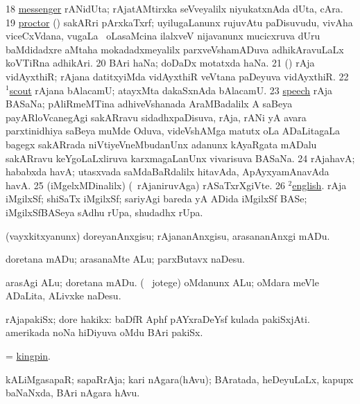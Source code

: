 \num{18}  \hyperref{kandict_m.pdf}{M}{messenger pagu(1)}{messenger} rANidUta; rAjatAMtirxka seVveyalilx niyukatxnAda dUta, cAra. 
\num{19}  \hyperref{kandict_p.pdf}{P}{proctor pagu}{proctor} (\birx) sakARri pArxkaTxrf; uyilugaLanunx rujuvAtu paDisuvudu, vivAha viceCxVdana, \mo vugaLa \vi\ oLasaMcina ilalxveV nijavanunx mucicxruva dUru baMdidadxre aMtaha mokadadxmeyalilx parxveVshamADuva adhikAravuLaLx koVTiRna adhikAri. 
\num{20}  BAri haNa; doDaDx motatxda haNa. 
\num{21}  (\birx) rAja vidAyxthiR; rAjana datitxyiMda vidAyxthiR veVtana paDeyuva vidAyxthiR. 
\num{22}  \hyperref{kandict_s.pdf}{S}{scout(1) pagu}{$^1$scout} rAjana bAlacamU; atayxMta dakaSxnAda bAlacamU. 
\num{23}  \hyperref{kandict_s.pdf}{S}{speech pagu(5)}{speech} rAja BASaNa; pAliRmeMTina adhiveVshanada AraMBadalilx A saBeya payARloVcanegAgi sakARravu sidadhxpaDisuva, rAja, rANi yA avara parxtinidhiya saBeya muMde Oduva, videVshAMga matutx oLa ADaLitagaLa bagegx sakARrada niVtiyeVneMbudanUnx adanunx kAyaRgata mADalu sakARravu keYgoLaLxliruva karxmagaLanUnx vivarisuva BASaNa. 
\num{24}  rAja{ha}vA; hababxda havA; utasxvada saMdaBaRdalilx hitavAda, ApAyxyamAnavAda havA. 
\num{25}  (iMgelxMDinalilx) (\kanmu\ rAjaniruvAga) rASaTxrXgiVte. 
\num{26}  \hyperref{kandict_e.pdf}{E}{english(2) pagu(5)}{$^2$english}. rAja iMgilxSf; shiSaTx iMgilxSf; sariyAgi bareda yA ADida iMgilxSf BASe; iMgilxSfBASeya sAdhu rUpa, shudadhx rUpa. 
\enum
\emng
\eentry

\bentry
{}
\gl{\sakirx}
\bmng
(vayxkitxyanunx) doreyanAnxgisu; rAjananAnxgisu, arasananAnxgi mADu. 
\emng

\noindent
\gl{\akirx}
\bmng
doretana mADu; arasanaMte ALu; parxButavx naDesu. 
\emng

\noindent
\gl{\pagu}
\bmng
{} 
\banum
{} arasAgi ALu; doretana mADu. 
 (\sA\  jotege) oMdanunx ALu; oMdara meVle ADaLita, ALivxke naDesu. 
\eanum
\emng
\eentry

\bentry
{}
\gl{\nA}
\bmng
rAjapakiSx; dore hakikx: 
\banum
{} baDfR Aphf pAYxraDeYsf kulada pakiSxjAti. 
 amerikada noNa hiDiyuva oMdu BAri pakiSx. 
\eanum
\emng
\eentry

\bentry
{}
\gl{\nA}
\bmng
 = \hyperlink{kingpin}{kingpin}. 
\emng
\eentry

\bentry
{}
\gl{\nA}
\bmng
kALiMgasapaR; sapaRrAja; kari nAgara(hAvu); BAratada, heDeyuLaLx, kapupx baNaNxda, BAri nAgara hAvu. 
\emng
\eentry

